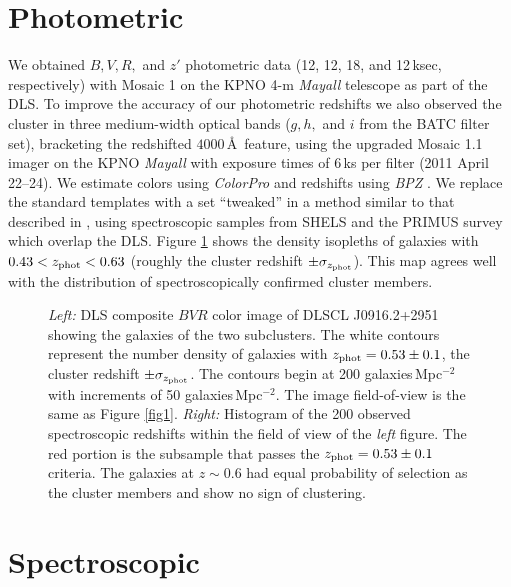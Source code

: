 \section{Photometric}

We obtained $B,V,R,$ and $z'$ photometric data (12, 12, 18, and 12\,ksec, respectively) with Mosaic 1 on the KPNO 4-m {\it Mayall} telescope as part of the DLS.
To improve the accuracy of our photometric redshifts we also observed the cluster in three medium-width optical bands ($g,h,$ and $i$ from the BATC filter set), bracketing the redshifted $4000$\,\AA\, feature, using the upgraded Mosaic 1.1 imager on the KPNO {\it Mayall} with exposure times of 6\,ks per filter (2011 April 22--24).
We estimate colors using \emph{ColorPro} \citep{Coe:2006jf} and redshifts using \emph{BPZ} \citep{Benitez:2000jr}.
We replace the standard templates with a set ``tweaked'' in a method similar to that described in \citet{Ilbert:2006bw}, using spectroscopic samples from SHELS \citep{Geller:2005dj} and the PRIMUS survey \citep{Coil:2010to} which overlap the DLS.
Figure \ref{fig2} shows the density isopleths of galaxies with $0.43<z_{\rm phot}<0.63$ (roughly the cluster redshift $\pm\sigma_{z_{\rm phot}}$).
This map agrees well with the distribution of spectroscopically confirmed cluster members.

\begin{figure}
\caption[Color image of DLSCL J0916.2+2951 and its galaxy number density with a histogram of the spectroscopic redshifts in the area.]{\emph{Left:} DLS composite $BVR$ color image of DLSCL J0916.2+2951 showing  the galaxies of the two subclusters. The white contours represent the number density of galaxies with $z_{\rm phot}=0.53\pm0.1$, the cluster redshift $\pm\sigma_{z_{\rm phot}}$. The contours begin at 200 galaxies\,Mpc$^{-2}$ with increments of 50 galaxies\,Mpc$^{-2}$. 
The image field-of-view is the same as Figure \ref{fig1}.
\emph{Right:} Histogram of the 200 observed spectroscopic redshifts within the field of view of the \emph{left} figure.  The red portion is the subsample that passes the $z_{\rm phot}=0.53\pm0.1$ criteria. The galaxies at $z\sim0.6$ had equal probability of selection as the cluster members and show no sign of clustering. 
\label{fig2}}
\end{figure}

\section{Spectroscopic}\label{section:MusketBallSpectroscopy}


